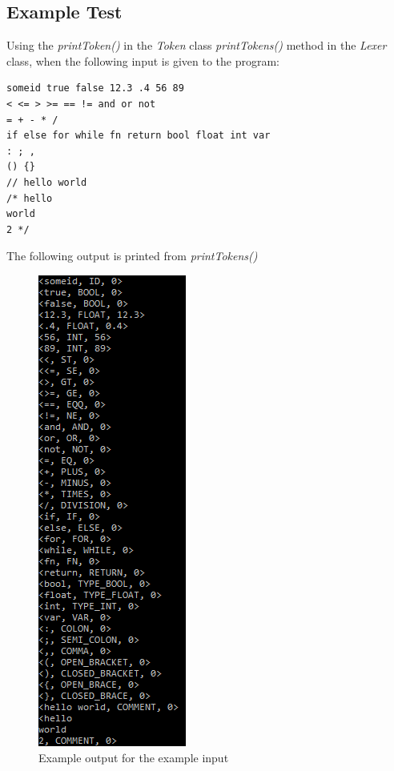 \subsection{Example Test}
Using the \textit{printToken()} in the \textit{Token} class \textit{printTokens()} method in the \textit{Lexer} class, when the following input is given to the program:
\begin{lstlisting}
someid true false 12.3 .4 56 89
< <= > >= == != and or not
= + - * /
if else for while fn return bool float int var
: ; ,
() {}
// hello world
/* hello 
world
2 */
\end{lstlisting}
The following output is printed from \textit{printTokens()}

\begin{figure}[H]
	\centering
	\includegraphics[scale=1]{Images/Q1_ExampleTest.png}
	\caption{Example output for the example input}
\end{figure}

